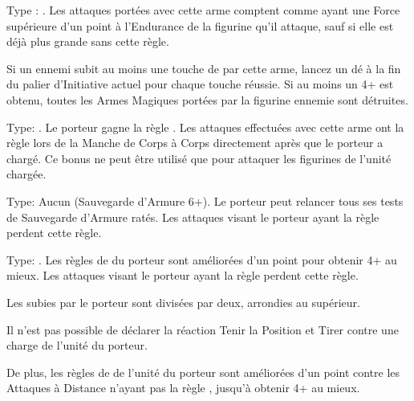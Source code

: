 \closearmynewsection






\startarmymagicalitems

\armymagicalweapons

\startpricelist

 Type : \hw{}. Les attaques portées avec cette arme comptent comme ayant une Force supérieure d'un point à l'Endurance de la figurine qu'il attaque, sauf si elle est déjà plus grande sans cette règle.

Si un ennemi subit au moins une touche de par cette arme, lancez un dé à la fin du palier d'Initiative actuel pour chaque touche réussie. Si au moins un 4+ est obtenu, toutes les Armes Magiques portées par la figurine ennemie sont détruites.

 Type: \lance{}. Le porteur gagne la règle . Les attaques effectuées avec cette arme ont la règle  lors de la Manche de Corps à Corps directement après que le porteur a chargé. Ce bonus ne peut être utilisé que pour attaquer les figurines de l'unité chargée.

\endpricelist

\armymagicalarmour

\startpricelist

 Type: Aucun (Sauvegarde d'Armure 6+). Le porteur peut relancer tous ses tests de Sauvegarde d'Armure ratés. Les attaques visant le porteur ayant la règle  perdent cette règle.

 Type: \ha{}. Les règles de \wardsave{} du porteur sont améliorées d'un point pour obtenir 4+ au mieux. Les attaques visant le porteur ayant la règle \holyattacks{} perdent cette règle.

\endpricelist

\armytalismans

\startpricelist

 Les \multiplewounds{}{} subies par le porteur sont divisées par deux, arrondies au supérieur.

 Il n'est pas possible de déclarer la réaction Tenir la Position et Tirer contre une charge de l'unité du porteur.

De plus, les règles de \wardsave{} de l'unité du porteur sont améliorées d'un point contre les Attaques à Distance n'ayant pas la règle \magicalattacks{}, jusqu'à obtenir 4+ au mieux.

